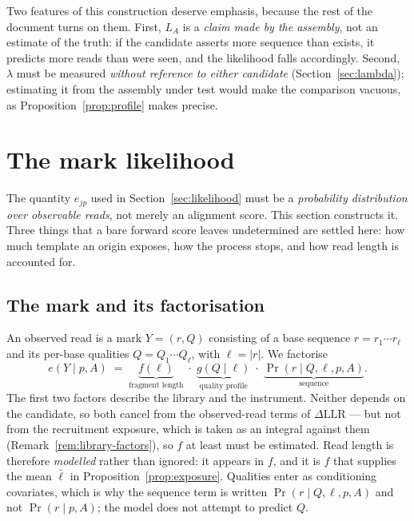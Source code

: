 \documentclass[11pt]{article}
\newcommand{\Prob}{\Pr}
\begin{document}
Two features of this construction deserve emphasis, because the rest of the
document turns on them.  First, $L_A$ is a \emph{claim made by the assembly},
not an estimate of the truth: if the candidate asserts more sequence than
exists, it predicts more reads than were seen, and the likelihood falls
accordingly.  Second, $\lambda$ must be measured \emph{without reference to
either candidate} (Section~\ref{sec:lambda}); estimating it from the assembly
under test would make the comparison vacuous, as Proposition~\ref{prop:profile}
makes precise.

\section{The mark likelihood}
\label{sec:emission}

The quantity $e_{jp}$ used in Section~\ref{sec:likelihood} must be a
\emph{probability distribution over observable reads}, not merely an alignment
score.  This section constructs it.  Three things that a bare forward score
leaves undetermined are settled here: how much template an origin exposes, how
the process stops, and how read length is accounted for.

\subsection{The mark and its factorisation}

An observed read is a mark $Y = (r, Q)$ consisting of a base sequence
$r = r_1\cdots r_\ell$ and its per-base qualities $Q = Q_1\cdots Q_\ell$, with
$\ell = |r|$.  We factorise
\begin{equation}
    e(Y \mid p, A)
    \;=\; \underbrace{f(\ell)}_{\text{fragment length}}
    \;\cdot\; \underbrace{g(Q \mid \ell)}_{\text{quality profile}}
    \;\cdot\; \underbrace{\Prob(r \mid Q, \ell, p, A)}_{\text{sequence}} .
\label{eq:mark-factorisation}
\end{equation}
The first two factors describe the library and the instrument.  Neither depends
on the candidate, so both cancel from the observed-read terms of
$\Delta\mathrm{LLR}$ --- but not from the recruitment exposure, which is taken
as an integral against them (Remark~\ref{rem:library-factors}), so $f$ at least
must be estimated.  Read length is therefore \emph{modelled} rather than
ignored: it appears in $f$, and it is $f$ that supplies the mean $\bar\ell$ in
Proposition~\ref{prop:exposure}.  Qualities enter as conditioning covariates,
which is why the sequence term is written $\Prob(r\mid Q,\ell,p,A)$ and not
$\Prob(r\mid p,A)$; the model does not attempt to predict $Q$.
\end{document}
